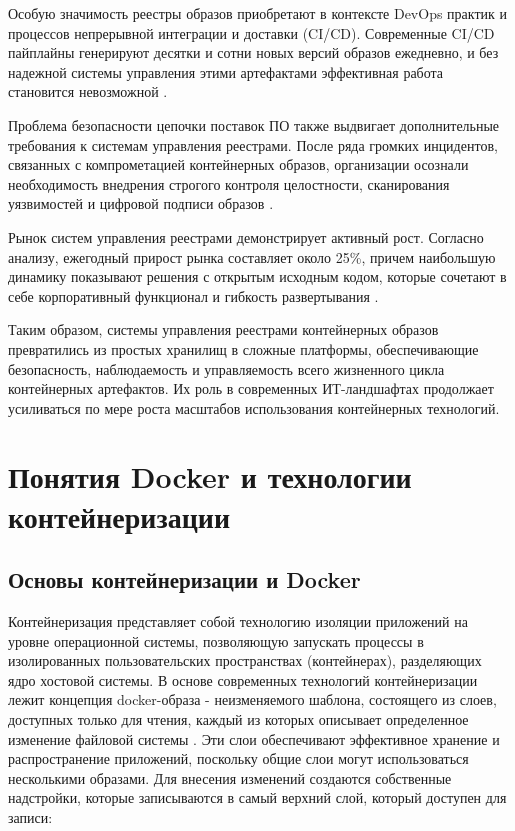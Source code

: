 Особую значимость реестры образов приобретают в контексте DevOps практик и процессов непрерывной интеграции и доставки (CI/CD). Современные CI/CD пайплайны генерируют десятки и сотни новых версий образов ежедневно, и без надежной системы управления этими артефактами эффективная работа становится невозможной \cite{luksha2020}.

Проблема безопасности цепочки поставок ПО также выдвигает дополнительные требования к системам управления реестрами. После ряда громких инцидентов, связанных с компрометацией контейнерных образов, организации осознали необходимость внедрения строгого контроля целостности, сканирования уязвимостей и цифровой подписи образов \cite{sysdig2024}.

Рынок систем управления реестрами демонстрирует активный рост. Согласно анализу, ежегодный прирост рынка составляет около 25\%, причем наибольшую динамику показывают решения с открытым исходным кодом, которые сочетают в себе корпоративный функционал и гибкость развертывания \cite{forrester2022}.

Таким образом, системы управления реестрами контейнерных образов превратились из простых хранилищ в сложные платформы, обеспечивающие безопасность, наблюдаемость и управляемость всего жизненного цикла контейнерных артефактов. Их роль в современных ИТ-ландшафтах продолжает усиливаться по мере роста масштабов использования контейнерных технологий.


\section{Понятия Docker и технологии контейнеризации}
\subsection{Основы контейнеризации и Docker}

Контейнеризация представляет собой технологию изоляции приложений на уровне операционной системы, позволяющую запускать процессы в изолированных пользовательских пространствах (контейнерах), разделяющих ядро хостовой системы. В основе современных технологий контейнеризации лежит концепция docker-образа - неизменяемого шаблона, состоящего из слоев, доступных только для чтения, каждый из которых описывает определенное изменение файловой системы \cite{mill2020}. Эти слои обеспечивают эффективное хранение и распространение приложений, поскольку общие слои могут использоваться несколькими образами. Для внесения изменений создаются собственные надстройки, которые записываются в самый верхний слой, который доступен для записи:

